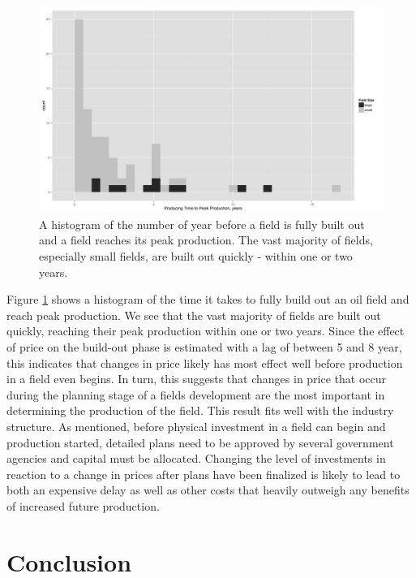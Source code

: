 \documentclass[12pt]{article}
\begin{document}
\begin{figure}
	\includegraphics[width=1\textwidth]{figures/field_time_to_peak_print.png}
	\caption{A histogram of the number of year before a field is fully built out and a field reaches its peak production.  The vast majority of fields, especially small fields, are built out quickly - within one or two years.}
	\label{gam_buildout_hist}
\end{figure}

Figure \ref{gam_buildout_hist} shows a histogram of the time it takes to fully build out an oil field and reach peak production.  We see that the vast majority of fields are built out quickly, reaching their peak production within one or two years.  Since the effect of price on the build-out phase is estimated with a lag of between 5 and 8 year, this indicates that changes in price likely has most effect well before production in a field even begins.  In turn, this suggests that changes in price that occur during the planning stage of a fields development are the most important in determining the production of the field.  This result fits well with the industry structure.  As mentioned, before physical investment in a field can begin and production started, detailed plans need to be approved by several government agencies and capital must be allocated.  Changing the level of investments in reaction to a change in prices after plans have been finalized is likely to lead to both an expensive delay as well as other costs that heavily outweigh any benefits of increased future production.  

\section{Conclusion}
\end{document}
